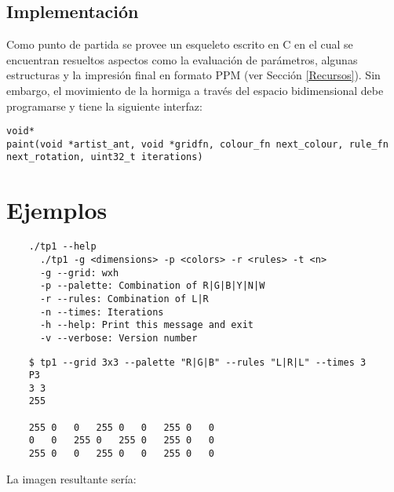 \documentclass{article}
\begin{document}
\subsection{Implementación}
Como punto de partida se provee un esqueleto escrito en C en el cual se encuentran resueltos aspectos como la evaluación de parámetros, 
algunas estructuras y la impresión final en formato PPM (ver Sección \ref{Recursos}).  Sin embargo, el movimiento de la hormiga a través del
espacio bidimensional debe programarse y tiene la siguiente interfaz:

\begin{small}
\begin{verbatim}
void*
paint(void *artist_ant, void *gridfn, colour_fn next_colour, rule_fn next_rotation, uint32_t iterations)
\end{verbatim}
\end{small}

\pagebreak
\section{Ejemplos}

    \begin{verbatim}
    ./tp1 --help
      ./tp1 -g <dimensions> -p <colors> -r <rules> -t <n>
      -g --grid: wxh
      -p --palette: Combination of R|G|B|Y|N|W
      -r --rules: Combination of L|R
      -n --times: Iterations
      -h --help: Print this message and exit
      -v --verbose: Version number
    \end{verbatim}

    \begin{verbatim}
    $ tp1 --grid 3x3 --palette "R|G|B" --rules "L|R|L" --times 3
    P3
    3 3
    255

    255 0   0   255 0   0   255 0   0
    0   0   255 0   255 0   255 0   0 
    255 0   0   255 0   0   255 0   0
    \end{verbatim}
La imagen resultante sería:
\begin{center}
\end{center}
\end{document}
